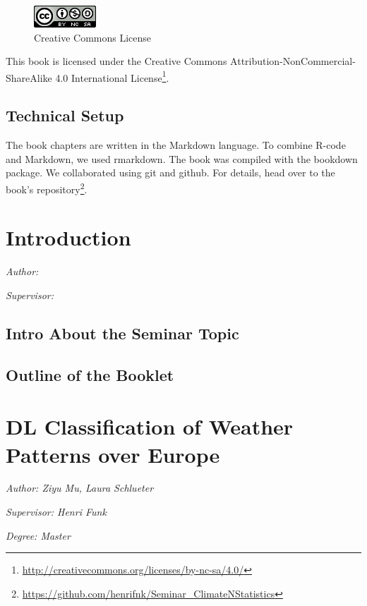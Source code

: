\documentclass[
]{krantz}
\renewcommand{\href}[2]{#2\footnote{\url{#1}}}
\begin{document}
\begin{figure}
\centering
\includegraphics{by-nc-sa.png}
\caption{Creative Commons License}
\end{figure}

This book is licensed under the \href{http://creativecommons.org/licenses/by-nc-sa/4.0/}{Creative Commons Attribution-NonCommercial-ShareAlike 4.0 International License}.

\mainmatter

\section*{Technical Setup}\label{technical-setup}


The book chapters are written in the Markdown language.
To combine R-code and Markdown, we used rmarkdown.
The book was compiled with the bookdown package.
We collaborated using git and github.
For details, head over to the \href{https://github.com/henrifnk/Seminar_ClimateNStatistics}{book's repository}.

\chapter{Introduction}\label{introduction}

\emph{Author: }

\emph{Supervisor: }

\section{Intro About the Seminar Topic}\label{intro-about-the-seminar-topic}

\section{Outline of the Booklet}\label{outline-of-the-booklet}

\chapter{DL Classification of Weather Patterns over Europe}\label{sm}

\emph{Author: Ziyu Mu, Laura Schlueter}

\emph{Supervisor: Henri Funk}

\emph{Degree: Master}
\end{document}
